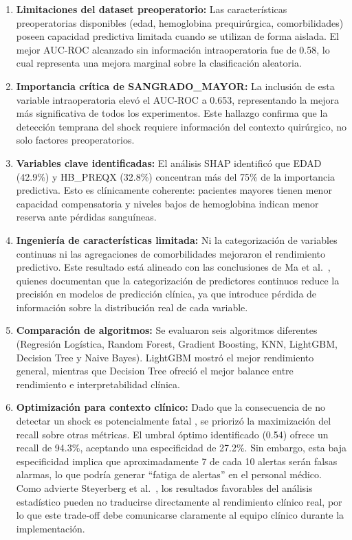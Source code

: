 \documentclass[12pt, letterpaper]{article}
\begin{document}
\begin{enumerate}
    \item \textbf{Limitaciones del dataset preoperatorio:} Las características preoperatorias disponibles (edad, hemoglobina prequirúrgica, comorbilidades) poseen capacidad predictiva limitada cuando se utilizan de forma aislada. El mejor AUC-ROC alcanzado sin información intraoperatoria fue de 0.58, lo cual representa una mejora marginal sobre la clasificación aleatoria.
    
    \item \textbf{Importancia crítica de SANGRADO\_MAYOR:} La inclusión de esta variable intraoperatoria elevó el AUC-ROC a 0.653, representando la mejora más significativa de todos los experimentos. Este hallazgo confirma que la detección temprana del shock requiere información del contexto quirúrgico, no solo factores preoperatorios.
    
    \item \textbf{Variables clave identificadas:} El análisis SHAP identificó que EDAD (42.9\%) y HB\_PREQX (32.8\%) concentran más del 75\% de la importancia predictiva. Esto es clínicamente coherente: pacientes mayores tienen menor capacidad compensatoria y niveles bajos de hemoglobina indican menor reserva ante pérdidas sanguíneas.
    
    \item \textbf{Ingeniería de características limitada:} Ni la categorización de variables continuas ni las agregaciones de comorbilidades mejoraron el rendimiento predictivo. Este resultado está alineado con las conclusiones de Ma et al.\ \cite{ma2023}, quienes documentan que la categorización de predictores continuos reduce la precisión en modelos de predicción clínica, ya que introduce pérdida de información sobre la distribución real de cada variable.
    
    \item \textbf{Comparación de algoritmos:} Se evaluaron seis algoritmos diferentes (Regresión Logística, Random Forest, Gradient Boosting, KNN, LightGBM, Decision Tree y Naive Bayes). LightGBM mostró el mejor rendimiento general, mientras que Decision Tree ofreció el mejor balance entre rendimiento e interpretabilidad clínica.
    
    \item \textbf{Optimización para contexto clínico:} Dado que la consecuencia de no detectar un shock es potencialmente fatal \cite{cannon2018}, se priorizó la maximización del recall sobre otras métricas. El umbral óptimo identificado (0.54) ofrece un recall de 94.3\%, aceptando una especificidad de 27.2\%. Sin embargo, esta baja especificidad implica que aproximadamente 7 de cada 10 alertas serán falsas alarmas, lo que podría generar ``fatiga de alertas'' en el personal médico. Como advierte Steyerberg et al.\ \cite{steyerberg2018}, los resultados favorables del análisis estadístico pueden no traducirse directamente al rendimiento clínico real, por lo que este trade-off debe comunicarse claramente al equipo clínico durante la implementación.
    

\end{enumerate}
\end{document}
